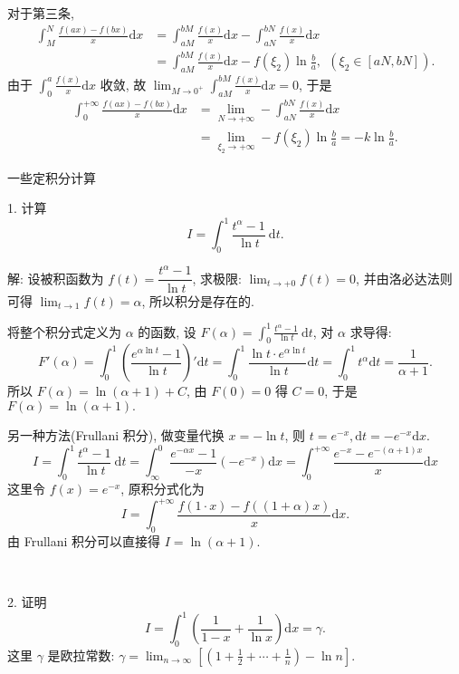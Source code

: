 对于第三条, 
\begin{align*}
\int_M^N\frac{f(ax) - f(bx)}{x}\mathrm{d}x &= \int_{aM}^{bM}\frac{f(x)}{x}\mathrm{d}x - \int_{aN}^{bN}\frac{f(x)}{x}\mathrm{d}x \\
&= \int_{aM}^{bM}\frac{f(x)}{x}\mathrm{d}x - f(\xi_2)\ln\frac{b}{a}, \ \ (\xi_2\in[aN,bN]).
\end{align*}
由于 $\displaystyle \int_0^a\frac{f(x)}{x}\mathrm{d}x$ 收敛, 故 $\displaystyle \lim_{M\to0^+}\int_{aM}^{bM}\frac{f(x)}{x}\mathrm{d}x = 0$, 于是
\begin{align*}
\int_0^{+\infty}\frac{f(ax) - f(bx)}{x}\mathrm{d}x &= \lim_{N\to+\infty}-\int_{aN}^{bN}\frac{f(x)}{x}\mathrm{d}x \\
&= \lim_{\xi_2\to+\infty}-f(\xi_2)\ln\frac{b}{a} = -k\ln\frac{b}{a} .
\end{align*}

\newpage
\noindent 一些定积分计算

1. 计算
\[ I = \int_0^1\frac{t^\alpha - 1}{\ln t}\ \mathrm{d}t .\]

解: 设被积函数为 $f(t) = \dfrac{t^\alpha - 1}{\ln t}$, 求极限: $\displaystyle \lim_{t \to +0} f(t) = 0$, 并由洛必达法则可得 $\displaystyle \lim_{t \to 1} f(t) = \alpha$, 所以积分是存在的.

将整个积分式定义为 $\alpha$ 的函数, 设 $\displaystyle F(\alpha) = \int_0^1\frac{t^\alpha - 1}{\ln t}\ \mathrm{d}t$, 对 $\alpha$ 求导得:
\[F'(\alpha) = \int_0^1\left(\frac{e^{\alpha\ln t} - 1}{\ln t}\right)'\mathrm{d}t = \int_0^1\frac{\ln t\cdot e^{\alpha\ln t}}{\ln t}\mathrm{d}t = \int_0^1 t^\alpha\mathrm{d}t = \frac{1}{\alpha+1} .\]
所以 $F(\alpha) = \ln(\alpha+1)+C$, 由 $F(0) = 0$ 得 $C = 0$, 于是 $F(\alpha) = \ln(\alpha+1).$

另一种方法(Frullani 积分), 做变量代换 $x = -\ln t$, 则 $t = e^{-x}, \mathrm{d}t = -e^{-x}\mathrm{d}x$. 
\[ I = \int_0^1\frac{t^\alpha - 1}{\ln t}\ \mathrm{d}t = \int_{\infty}^0\frac{e^{-\alpha x} - 1}{-x}(-e^{-x})\mathrm{d}x = \int_0^{+\infty}\frac{e^{-x}-e^{-(\alpha+1)x}}{x}\mathrm{d}x\]
这里令 $f(x) = e^{-x}$, 原积分式化为
\[ I = \int_0^{+\infty}\frac{f(1\cdot x) - f((1+\alpha)x)}{x}\mathrm{d}x .\]
由 Frullani 积分可以直接得 $I = \ln(\alpha+1)$.

~

2. 证明
\[ I = \int_0^1\left(\frac{1}{1-x}+\frac{1}{\ln x}\right)\mathrm{d}x = \gamma .\]
这里 $\gamma$ 是欧拉常数: $\displaystyle \gamma = \lim_{n\to\infty}\left[(1+\frac{1}{2}+\cdots + \frac{1}{n}) - \ln n\right]$.

